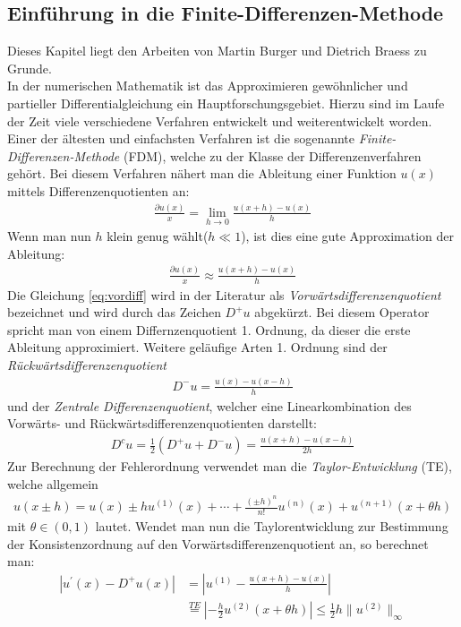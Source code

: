 \documentclass[12pt,titlepage]{article}
\begin{document}
\subsection{Einführung in die Finite-Differenzen-Methode}\label{sec:FD}
Dieses Kapitel liegt den Arbeiten von Martin Burger \cite{burger2006numerik} und Dietrich Braess \cite{braess2013finite} zu Grunde.\\
In der numerischen Mathematik ist das Approximieren gewöhnlicher und partieller Differentialgleichung ein Hauptforschungsgebiet. Hierzu sind im Laufe der Zeit viele verschiedene Verfahren entwickelt und weiterentwickelt worden. Einer der ältesten  und einfachsten Verfahren ist die sogenannte \textit{Finite-Differenzen-Methode} (FDM), welche zu der Klasse der Differenzenverfahren gehört. Bei diesem Verfahren nähert man die Ableitung einer Funktion $u(x)$ mittels Differenzenquotienten an:
\begin{align}
 \frac{\partial u(x)}{x}=\lim\limits_{h \rightarrow 0} \frac{u(x+h)-u(x)}{h}
\end{align}
Wenn man nun $h$ klein genug wählt($h\ll1$), ist dies eine gute Approximation der Ableitung:
\begin{align}
 \frac{\partial u(x)}{x}\approx \frac{u(x+h)-u(x)}{h}\label{eq:vordiff}
\end{align}
Die Gleichung \eqref{eq:vordiff} wird in der Literatur als \textit{Vorwärtsdifferenzenquotient} bezeichnet und wird durch das Zeichen $D^+u$ abgekürzt. Bei diesem Operator spricht man von einem Differnzenquotient 1. Ordnung, da dieser die erste Ableitung approximiert. Weitere geläufige Arten 1. Ordnung sind der \textit{Rückwärtsdifferenzenquotient}
\begin{align}
 D^-u= \frac{u(x)-u(x-h)}{h}
\end{align}
und der \textit{Zentrale Differenzenquotient}, welcher eine Linearkombination des Vorwärts- und Rückwärtsdifferenzenquotienten darstellt:
\begin{align}
 D^cu=\frac{1}{2}(D^+u+D^-u)= \frac{u(x+h)-u(x-h)}{2h}
\end{align}
Zur Berechnung der Fehlerordnung verwendet man die \textit{Taylor-Entwicklung} (TE), welche allgemein
\begin{align}
 u(x\pm h)=u(x)\pm hu^{(1)}(x)+\cdots+\frac{(\pm h)^n}{n!}u^{(n)}(x)+u^{(n+1)}(x+\theta h)
\end{align}
mit $\theta\in(0,1)$ lautet. Wendet man nun die Taylorentwicklung zur Bestimmung der Konsistenzordnung auf den Vorwärtsdifferenzenquotient an, so berechnet man:
\begin{align}
 |u^{'}(x)-D^+u(x)|&=|u^{(1)}-\frac{u(x+h)-u(x)}{h}|\nonumber\\&\overset{TE}{=}|-\frac{h}{2}u^{(2)}(x+\theta h)|\le\frac{1}{2} h\|u^{(2)}\|_{\infty}
\end{align}
\end{document}
